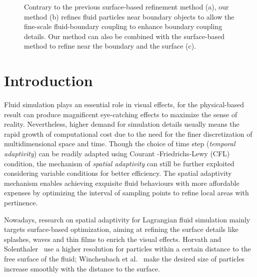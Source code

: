 \documentclass[VANCOUVER,STIX1COL]{WileyNJD-v2}
\begin{document}
\begin{figure}[htbp]

\centering
{}
\vspace{-0.7\baselineskip}
\caption{Contrary to the previous surface-based refinement method (a), our method (b) refines fluid particles near boundary objects to allow the fine-scale fluid-boundary coupling to enhance boundary coupling details. Our method can also be combined with the surface-based method to refine near the boundary and the surface (c).}
\label{fig:refine}

\end{figure}

\section{Introduction}
Fluid simulation plays an essential role in visual effects, for the physical-based result can produce magnificent eye-catching effects to maximize the sense of reality. Nevertheless, higher demand for simulation details usually means the rapid growth of computational cost due to the need for the finer discretization of multidimensional space and time. Though the choice of time step (\emph{temporal adaptivity}) can be readily adapted using Courant
-Friedrichs-Lewy (CFL) condition, the mechanism of \emph{spatial adaptivity} can still be further exploited considering variable conditions for better efficiency. The spatial adaptivity mechanism enables achieving exquisite fluid behaviours with more affordable expenses by optimizing the interval of sampling points to refine local areas with pertinence.

Nowadays, research on spatial adaptivity for Lagrangian fluid simulation mainly targets surface-based optimization, aiming at refining the surface details like splashes, waves and thin films to enrich the visual effects. Horvath and Solenthaler~\cite{Horvath13} use a higher resolution for particles within a certain distance to the free surface of the fluid; Winchenbach et al.~\cite{Winchenbach17} make the desired size of particles increase smoothly with the distance to the surface.
\end{document}
